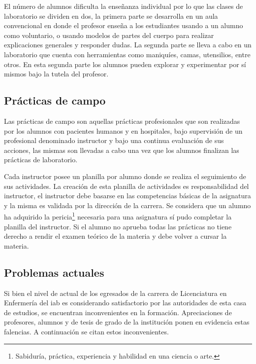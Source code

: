 El número de alumnos dificulta la enseñanza individual por lo que las clases de
laboratorio se dividen en dos, la primera parte se desarrolla en un aula
convencional en donde el profesor enseña a los estudiantes usando a un
alumno como voluntario, o usando modelos de partes del cuerpo para realizar
explicaciones generales y responder dudas. La segunda parte se lleva a cabo en
un laboratorio que cuenta con herramientas como maniquíes, camas, utensilios,
entre otros. En esta segunda parte los alumnos pueden explorar y experimentar
por sí mismos bajo la tutela del profesor.

\subsection{Prácticas de campo}

Las prácticas de campo son aquellas prácticas profesionales que son realizadas
por los alumnos con pacientes humanos y en hospitales, bajo supervisión de un
profesional denominado instructor y bajo una continua evaluación de sus
acciones, las mismas son llevadas a cabo una vez que los alumnos finalizan las
prácticas de laboratorio.

Cada instructor posee un planilla por alumno donde se realiza el seguimiento de
sus actividades. La creación de esta planilla de actividades es responsabilidad
del instructor, el instructor debe basarse en las competencias básicas de la
asignatura y la misma es validada por la dirección de la carrera. Se considera
que un alumno ha adquirido la pericia\footnote{Sabiduría, práctica, experiencia
y habilidad en una ciencia o arte.} necesaria para una asignatura sí
pudo completar la planilla del instructor. Si el alumno no aprueba todas las
prácticas no tiene derecho a rendir el examen teórico de la materia y debe
volver a cursar la materia.

\subsection{Problemas actuales}

Si bien el nivel de actual de los egresados de la carrera de Licenciatura en
Enfermería del \gls{iab} es considerando satisfactorio por las autoridades de
esta casa de estudios, se encuentran inconvenientes en la formación.
Apreciaciones de profesores, alumnos y de tesis de grado de la
institución\cite{iab:tesis_atencion,iab:tesis_alumnos} ponen en evidencia estas
falencias. A continuación se citan estos inconvenientes.

